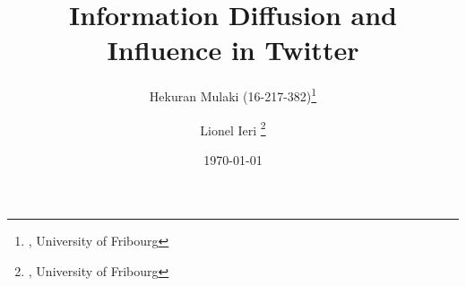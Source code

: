 \documentclass[a4paper,12pt]{article}
\begin{document}

\title{Information Diffusion and Influence in Twitter } %

\author{Hekuran Mulaki (16-217-382)\thanks{, University of Fribourg}
    \and Lionel Ieri \thanks{\email{}, University of Fribourg}
   }	%



\date{\today} %

\maketitle







\newpage




\end{document}
